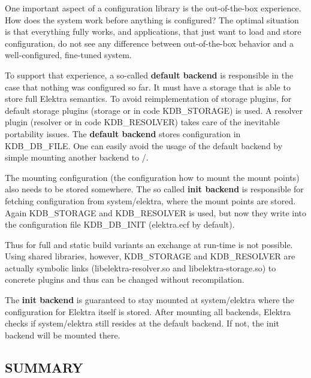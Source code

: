 One important aspect of a configuration library is the out-\/of-\/the-\/box experience. How does the system work before anything is configured? The optimal situation is that everything fully works, and applications, that just want to load and store configuration, do not see any difference between out-\/of-\/the-\/box behavior and a well-\/configured, fine-\/tuned system.

To support that experience, a so-\/called {\bfseries default backend} is responsible in the case that nothing was configured so far. It must have a storage that is able to store full Elektra semantics. To avoid reimplementation of storage plugins, for default storage plugins ({\ttfamily storage} or in code {\ttfamily K\+D\+B\+\_\+\+S\+T\+O\+R\+A\+GE}) is used. A resolver plugin ({\ttfamily resolver} or in code {\ttfamily K\+D\+B\+\_\+\+R\+E\+S\+O\+L\+V\+ER}) takes care of the inevitable portability issues. The {\bfseries default backend} stores configuration in {\ttfamily K\+D\+B\+\_\+\+D\+B\+\_\+\+F\+I\+LE}. One can easily avoid the usage of the default backend by simple mounting another backend to {\ttfamily /}.

The mounting configuration (the configuration how to mount the mount points) also needs to be stored somewhere. The so called {\bfseries init backend} is responsible for fetching configuration from {\ttfamily system/elektra}, where the mount points are stored. Again {\ttfamily K\+D\+B\+\_\+\+S\+T\+O\+R\+A\+GE} and {\ttfamily K\+D\+B\+\_\+\+R\+E\+S\+O\+L\+V\+ER} is used, but now they write into the configuration file {\ttfamily K\+D\+B\+\_\+\+D\+B\+\_\+\+I\+N\+IT} ({\ttfamily elektra.\+ecf} by default).

Thus for full and static build variants an exchange at run-\/time is not possible. Using shared libraries, however, {\ttfamily K\+D\+B\+\_\+\+S\+T\+O\+R\+A\+GE} and {\ttfamily K\+D\+B\+\_\+\+R\+E\+S\+O\+L\+V\+ER} are actually symbolic links ({\ttfamily libelektra-\/resolver.\+so} and {\ttfamily libelektra-\/storage.\+so}) to concrete plugins and thus can be changed without recompilation.

The {\bfseries init backend} is guaranteed to stay mounted at {\ttfamily system/elektra} where the configuration for Elektra itself is stored. After mounting all backends, Elektra checks if {\ttfamily system/elektra} still resides at the default backend. If not, the init backend will be mounted there.

\subsection*{S\+U\+M\+M\+A\+RY}

